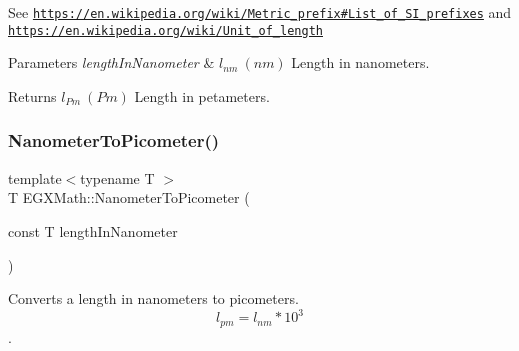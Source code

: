 See \href{https://en.wikipedia.org/wiki/Metric_prefix#List_of_SI_prefixes}{\tt https\+://en.\+wikipedia.\+org/wiki/\+Metric\+\_\+prefix\#\+List\+\_\+of\+\_\+\+S\+I\+\_\+prefixes} and \href{https://en.wikipedia.org/wiki/Unit_of_length}{\tt https\+://en.\+wikipedia.\+org/wiki/\+Unit\+\_\+of\+\_\+length} 
\begin{DoxyParams}{Parameters}
{\em length\+In\+Nanometer} & $ l_{nm}\ (nm)$ Length in nanometers. \\
\hline
\end{DoxyParams}
\begin{DoxyReturn}{Returns}
$ l_{Pm}\ (Pm)$ Length in petameters. 
\end{DoxyReturn}
\mbox{\label{group___e_g_x_math-_conversions-_length_conversions-_s_i-_nanometer-_s_i_gaba1e9bf91f6e065f8ba8be8dd039b499}} 
\subsubsection{\texorpdfstring{Nanometer\+To\+Picometer()}{NanometerToPicometer()}}
{\footnotesize\ttfamily template$<$typename T $>$ \\
T E\+G\+X\+Math\+::\+Nanometer\+To\+Picometer (\begin{DoxyParamCaption}\item[{const T}]{length\+In\+Nanometer }\end{DoxyParamCaption})}



Converts a length in nanometers to picometers. \[ l_{pm}=l_{nm} * 10^{3} \]. 

